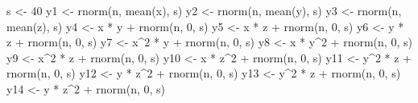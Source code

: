 \documentclass[
  11pt,
]{krantz}
\makeatletter
\newenvironment{Shaded}{\begin{snugshade}}{\end{snugshade}}
\newcommand{\DecValTok}[1]{\textcolor[rgb]{0.06,0.06,0.06}{#1}}
\newcommand{\FunctionTok}[1]{\textcolor[rgb]{0,0,0}{#1}}
\newcommand{\NormalTok}[1]{#1}
\newcommand{\OtherTok}[1]{\textcolor[rgb]{0.37,0.37,0.37}{#1}}
\newcommand{\SpecialCharTok}[1]{\textcolor[rgb]{0,0,0}{#1}}
\newenvironment{kframe}{%
\medskip{}
\setlength{\fboxsep}{.8em}
 \def\at@end@of@kframe{}%
 \ifinner\ifhmode%
  \def\at@end@of@kframe{\end{minipage}}%
  \begin{minipage}{\columnwidth}%
 \fi\fi%
 \def\FrameCommand##1{\hskip\@totalleftmargin \hskip-\fboxsep
 \colorbox{shadecolor}{##1}\hskip-\fboxsep
     \hskip-\linewidth \hskip-\@totalleftmargin \hskip\columnwidth}%
 \MakeFramed {\advance\hsize-\width
   \@totalleftmargin\z@ \linewidth\hsize
   \@setminipage}}%
 {\par\unskip\endMakeFramed%
 \at@end@of@kframe}
\renewenvironment{Shaded}{\begin{kframe}}{\end{kframe}}
\makeatother
\begin{document}
\begin{Shaded}
\begin{Highlighting}[]
\NormalTok{s }\OtherTok{\textless{}{-}} \DecValTok{40}
\NormalTok{y1 }\OtherTok{\textless{}{-}} \FunctionTok{rnorm}\NormalTok{(n, }\FunctionTok{mean}\NormalTok{(x), s)}
\NormalTok{y2 }\OtherTok{\textless{}{-}} \FunctionTok{rnorm}\NormalTok{(n, }\FunctionTok{mean}\NormalTok{(y), s)}
\NormalTok{y3 }\OtherTok{\textless{}{-}} \FunctionTok{rnorm}\NormalTok{(n, }\FunctionTok{mean}\NormalTok{(z), s)}
\NormalTok{y4 }\OtherTok{\textless{}{-}}\NormalTok{ x }\SpecialCharTok{*}\NormalTok{ y }\SpecialCharTok{+} \FunctionTok{rnorm}\NormalTok{(n, }\DecValTok{0}\NormalTok{, s)}
\NormalTok{y5 }\OtherTok{\textless{}{-}}\NormalTok{ x }\SpecialCharTok{*}\NormalTok{ z }\SpecialCharTok{+} \FunctionTok{rnorm}\NormalTok{(n, }\DecValTok{0}\NormalTok{, s)}
\NormalTok{y6 }\OtherTok{\textless{}{-}}\NormalTok{ y }\SpecialCharTok{*}\NormalTok{ z }\SpecialCharTok{+} \FunctionTok{rnorm}\NormalTok{(n, }\DecValTok{0}\NormalTok{, s)}
\NormalTok{y7 }\OtherTok{\textless{}{-}}\NormalTok{ x}\SpecialCharTok{\^{}}\DecValTok{2} \SpecialCharTok{*}\NormalTok{ y }\SpecialCharTok{+} \FunctionTok{rnorm}\NormalTok{(n, }\DecValTok{0}\NormalTok{, s)}
\NormalTok{y8 }\OtherTok{\textless{}{-}}\NormalTok{ x }\SpecialCharTok{*}\NormalTok{ y}\SpecialCharTok{\^{}}\DecValTok{2} \SpecialCharTok{+} \FunctionTok{rnorm}\NormalTok{(n, }\DecValTok{0}\NormalTok{, s)}
\NormalTok{y9 }\OtherTok{\textless{}{-}}\NormalTok{ x}\SpecialCharTok{\^{}}\DecValTok{2} \SpecialCharTok{*}\NormalTok{ z }\SpecialCharTok{+} \FunctionTok{rnorm}\NormalTok{(n, }\DecValTok{0}\NormalTok{, s)}
\NormalTok{y10 }\OtherTok{\textless{}{-}}\NormalTok{ x }\SpecialCharTok{*}\NormalTok{ z}\SpecialCharTok{\^{}}\DecValTok{2} \SpecialCharTok{+} \FunctionTok{rnorm}\NormalTok{(n, }\DecValTok{0}\NormalTok{, s)}
\NormalTok{y11 }\OtherTok{\textless{}{-}}\NormalTok{ y}\SpecialCharTok{\^{}}\DecValTok{2} \SpecialCharTok{*}\NormalTok{ z }\SpecialCharTok{+} \FunctionTok{rnorm}\NormalTok{(n, }\DecValTok{0}\NormalTok{, s)}
\NormalTok{y12 }\OtherTok{\textless{}{-}}\NormalTok{ y }\SpecialCharTok{*}\NormalTok{ z}\SpecialCharTok{\^{}}\DecValTok{2} \SpecialCharTok{+} \FunctionTok{rnorm}\NormalTok{(n, }\DecValTok{0}\NormalTok{, s)}
\NormalTok{y13 }\OtherTok{\textless{}{-}}\NormalTok{ y}\SpecialCharTok{\^{}}\DecValTok{2} \SpecialCharTok{*}\NormalTok{ z }\SpecialCharTok{+} \FunctionTok{rnorm}\NormalTok{(n, }\DecValTok{0}\NormalTok{, s)}
\NormalTok{y14 }\OtherTok{\textless{}{-}}\NormalTok{ y }\SpecialCharTok{*}\NormalTok{ z}\SpecialCharTok{\^{}}\DecValTok{2} \SpecialCharTok{+} \FunctionTok{rnorm}\NormalTok{(n, }\DecValTok{0}\NormalTok{, s)}

\end{Highlighting}
\end{Shaded}
\end{document}
